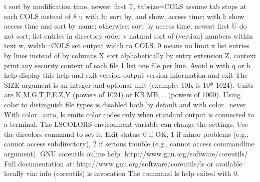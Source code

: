 \documentclass[letterpaper,12pt,english]{sphinxmanual}
\begin{document}
\begin{sphinxVerbatim}[commandchars=\\\{\}]
  \PYGZhy{}t                         sort by modification time, newest first
  \PYGZhy{}T, \PYGZhy{}\PYGZhy{}tabsize=COLS         assume tab stops at each COLS instead of 8
  \PYGZhy{}u                         with \PYGZhy{}lt: sort by, and show, access time;
                               with \PYGZhy{}l: show access time and sort by name;
                               otherwise: sort by access time, newest   first
  \PYGZhy{}U                         do not sort; list entries in directory order
  \PYGZhy{}v                         natural sort of (version) numbers within text
  \PYGZhy{}w, \PYGZhy{}\PYGZhy{}width=COLS           set output width to COLS.  0 means no limit
  \PYGZhy{}x                         list entries by lines instead of by columns
  \PYGZhy{}X                         sort alphabetically by entry extension
  \PYGZhy{}Z, \PYGZhy{}\PYGZhy{}context              print any security context of each file
  \PYGZhy{}1                         list one file per line.  Avoid \PYGZsq{}\PYGZbs{}n\PYGZsq{} with \PYGZhy{}q   or \PYGZhy{}b
      \PYGZhy{}\PYGZhy{}help     display this help and exit
      \PYGZhy{}\PYGZhy{}version  output version information and exit
The SIZE argument is an integer and optional unit (example: 10K is 10*  1024).
Units are K,M,G,T,P,E,Z,Y (powers of 1024) or KB,MB,... (powers of 1000).
Using color to distinguish file types is disabled both by default and
with \PYGZhy{}\PYGZhy{}color=never.  With \PYGZhy{}\PYGZhy{}color=auto, ls emits color codes only when
standard output is connected to a terminal.  The LS\PYGZus{}COLORS environment
variable can change the settings.  Use the dircolors command to set it.
Exit status:
 0  if OK,
 1  if minor problems (e.g., cannot access subdirectory),
 2  if serious trouble (e.g., cannot access command\PYGZhy{}line argument).
GNU coreutils online help: \PYGZlt{}http://www.gnu.org/software/coreutils/\PYGZgt{}
Full documentation at: \PYGZlt{}http://www.gnu.org/software/coreutils/ls\PYGZgt{}
or available locally via: info \PYGZsq{}(coreutils) ls invocation\PYGZsq{}
The command \PYGZdq{}ls \PYGZhy{}\PYGZhy{}help\PYGZdq{} exited with 0.
\end{sphinxVerbatim}
\end{document}
